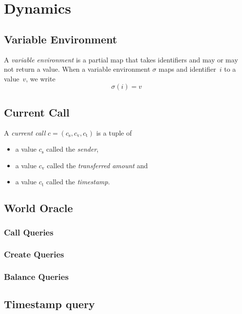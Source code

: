 \documentclass{book}
\begin{document}
\section{Dynamics}

\subsection{Variable Environment}

A \textit{variable environment} is a partial map that takes identifiers and may or may not return a value.  When a variable environment $\sigma$ maps and identifier~$i$ to a value~$v$, we write
\[
\sigma(i) = v
\]

\subsection{Current Call}

A \textit{current call} $c = (c_\mathrm{s}, c_\mathrm{v}, c_\mathrm{t})$ is a tuple of
\begin{itemize}
\item a value $c_\mathrm{s}$ called the \textit{sender},
\item a value $c_\mathrm{v}$ called the \textit{transferred amount} and
\item a value $c_\mathrm{t}$ called the \textit{timestamp}.
\end{itemize}

\subsection{World Oracle}

\subsubsection{Call Queries}

\subsubsection{Create Queries}

\subsubsection{Balance Queries}

\subsection{Timestamp query}
\end{document}
